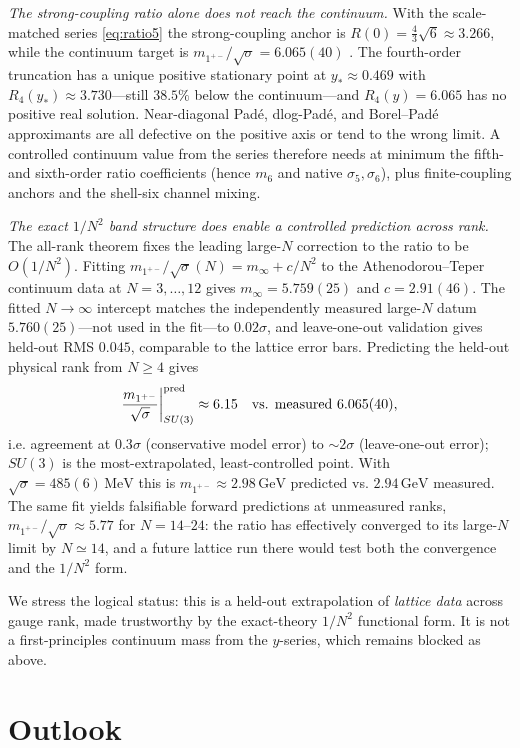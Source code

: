 \documentclass[11pt]{article}
\begin{document}
\emph{The strong-coupling ratio alone does not reach the continuum.} With the
scale-matched series \eqref{eq:ratio5} the strong-coupling anchor is
$R(0)=\tfrac43\sqrt6\approx3.266$, while the continuum target is
$m_{1^{+-}}/\sqrt\sigma=6.065(40)$ \cite{AthenodorouTeper2020}. The fourth-order
truncation has a unique positive stationary point at $y_*\approx0.469$ with
$R_4(y_*)\approx3.730$---still $38.5\%$ below the continuum---and $R_4(y)=6.065$ has
no positive real solution. Near-diagonal Pad\'e, dlog-Pad\'e, and Borel--Pad\'e
approximants are all defective on the positive axis or tend to the wrong limit. A
controlled continuum value from the series therefore needs at minimum the fifth- and
sixth-order ratio coefficients (hence $m_6$ and native $\sigma_5,\sigma_6$), plus
finite-coupling anchors and the shell-six channel mixing.

\emph{The exact $1/N^2$ band structure does enable a controlled prediction across
rank.} The all-rank theorem fixes the leading large-$N$ correction to the ratio to
be $O(1/N^2)$. Fitting $m_{1^{+-}}/\sqrt\sigma(N)=m_\infty+c/N^2$ to the
Athenodorou--Teper continuum data at $N=3,\dots,12$ \cite{AthenodorouTeper2020}
gives $m_\infty=5.759(25)$ and $c=2.91(46)$. The fitted $N\to\infty$ intercept
matches the independently measured large-$N$ datum $5.760(25)$---not used in the
fit---to $0.02\sigma$, and leave-one-out validation gives held-out RMS $0.045$,
comparable to the lattice error bars. Predicting the held-out physical rank from
$N\geq4$ gives
\[
\frac{m_{1^{+-}}}{\sqrt\sigma}\bigg|_{SU(3)}^{\rm pred}\approx6.15
\quad\text{vs. measured }6.065(40),
\]
i.e. agreement at $0.3\sigma$ (conservative model error) to $\sim2\sigma$
(leave-one-out error); $SU(3)$ is the most-extrapolated, least-controlled point.
With $\sqrt\sigma=485(6)\,\mathrm{MeV}$ this is $m_{1^{+-}}\approx2.98\,\mathrm{GeV}$
predicted vs. $2.94\,\mathrm{GeV}$ measured. The same fit yields falsifiable forward
predictions at unmeasured ranks, $m_{1^{+-}}/\sqrt\sigma\approx5.77$ for $N=14$--$24$:
the ratio has effectively converged to its large-$N$ limit by $N\simeq14$, and a
future lattice run there would test both the convergence and the $1/N^2$ form.

We stress the logical status: this is a held-out extrapolation of \emph{lattice
data} across gauge rank, made trustworthy by the exact-theory $1/N^2$ functional
form. It is not a first-principles continuum mass from the $y$-series, which remains
blocked as above.

\section{Outlook}
\label{sec:outlook}
\end{document}
